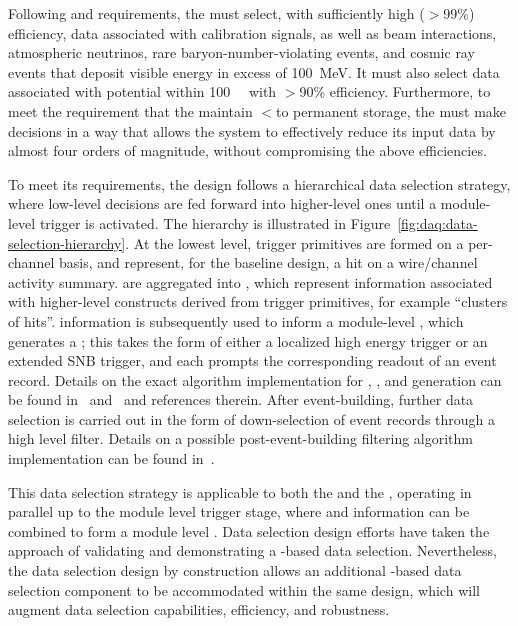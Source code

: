 Following   and  requirements, the
 must select, with sufficiently high ($>$99\%) efficiency, data associated with calibration
signals, as well as beam interactions,
atmospheric neutrinos, rare baryon-number-violating events, and cosmic
ray events that deposit visible energy in excess of \SI{100}{\MeV}. 
It must also select data associated with potential
 within \SI{100}{\kilo\parsec} with $>$90\% efficiency. 
Furthermore, to meet the requirement that the   maintain
$<$\offsitepbpy to permanent storage, the 
must make  decisions in a way that allows the  
system to effectively reduce its input data by almost four orders of magnitude,
without compromising the above efficiencies.

To meet its requirements, the  design follows a hierarchical data selection strategy, where low-level decisions are fed forward into higher-level ones until a module-level trigger is activated. 
The hierarchy is illustrated in
Figure~\ref{fig:daq:data-selection-hierarchy}. 
At the lowest level, trigger primitives are formed on a per-channel basis, and represent, for the baseline design, a hit on a wire/channel activity summary. 
 are aggregated into , which represent information associated with higher-level constructs derived from trigger primitives, for example ``clusters of hits''. 
 information is subsequently used to inform a
module-level , which generates a ;
this takes the form of either a localized high energy trigger or an
extended SNB trigger, and each prompts the corresponding readout of an
event record. Details on the
exact algorithm implementation for , , and  generation can be found
in~ and~ and references therein. 
After event-building, further data selection is carried out in the form
of down-selection of event records through a high level
filter. Details on a possible post-event-building filtering algorithm
implementation can be found in~.

This data selection strategy is applicable to both the  and
the , operating in parallel up to the module level trigger stage, where  and  information can be combined to form a module level . 
Data selection design efforts have taken the approach of validating
and demonstrating a -based data selection. Nevertheless,
the data selection design by construction allows an additional
-based data selection component to be accommodated within
the same design, which will augment data selection capabilities, efficiency, and robustness.

